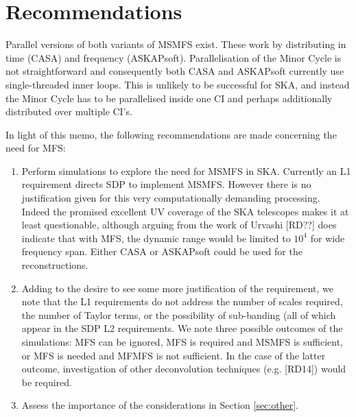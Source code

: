 \documentclass[11pt,a4paper,variablewidth]{article}
\begin{document}
\clearpage
\section{Recommendations}
\label{sec:recommendations}

Parallel versions of both variants of MSMFS exist. These work by distributing in time (CASA) and frequency (ASKAPsoft). Parallelisation of the Minor Cycle is not straightforward and consequently both CASA and ASKAPsoft currently use single-threaded inner loops. This is unlikely to be successful for SKA, and instead the Minor Cycle has to be parallelised inside one CI and perhaps additionally distributed over multiple CI's.

In light of this memo, the following recommendations are made concerning the need for MFS:

\begin{enumerate}
\item Perform simulations to explore the need for MSMFS in SKA. Currently an L1 requirement directs SDP to implement MSMFS. However there is no justification given for this very computationally demanding processing. Indeed the promised excellent UV coverage of the SKA telescopes makes it at least questionable, although arguing from the work of Urvashi [RD??] does indicate that with MFS, the dynamic range would be limited to $10^4$ for wide frequency span. Either CASA or ASKAPsoft could be used for the reconstructions.
\item Adding to the desire to see some more justification of the requirement, we note that the L1 requirements do not address the number of scales required, the number of Taylor terms, or the possibility of sub-banding (all of which appear in the SDP L2 requirements. We note three possible outcomes of the simulations: MFS can be ignored, MFS is required and MSMFS is sufficient, or MFS is needed and MFMFS is not sufficient. In the case of the latter outcome, investigation of other deconvolution techniques (e.g. [RD14]) would be required.
\item Assess the importance of the considerations in Section \ref{sec:other}.
\end{enumerate}
\end{document}
